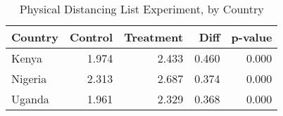 \begin{table}[ht]
\centering
\caption{Physical Distancing List Experiment, by Country} 
\label{tab:list}
\begin{tabular}{lrrrr}
  \hline
Country & Control & Treatment & Diff & p-value \\ 
  \hline
Kenya & 1.974 & 2.433 & 0.460 & 0.000 \\ 
  Nigeria & 2.313 & 2.687 & 0.374 & 0.000 \\ 
  Uganda & 1.961 & 2.329 & 0.368 & 0.000 \\ 
   \hline
\end{tabular}
\end{table}

